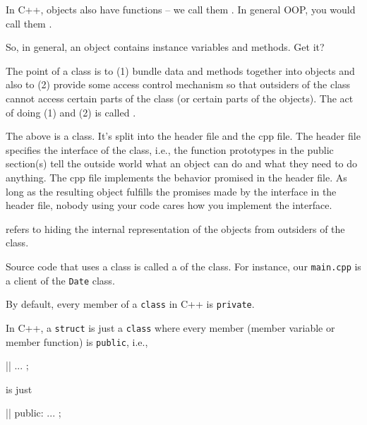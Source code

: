 In C++, objects also have functions -- we call them . In general OOP, you would call them .

So, in general, an object contains instance variables and methods. Get it?

The point of a class is to (1) bundle data and methods together into
objects and also to (2) provide some access control mechanism so that
outsiders of the class cannot access certain parts of the class (or
certain parts of the objects). The act of doing (1) and (2) is called
.

The above is a class. It's split into the header file and the cpp file. The
header file specifies the interface of the class, i.e., the function
prototypes in the public section(s) tell the outside world what an object
can do and what they need to do anything. The cpp file implements the
behavior promised in the header file. As long as the resulting object
fulfills the promises made by the interface in the header file, nobody
using your code cares how you implement the interface.

 refers to hiding the internal representation
of the objects from outsiders of the class.

Source code that uses a class is called a  of the
class. For instance, our \texttt{main.cpp} is a client of the
\texttt{Date} class.

By default, every member of a \texttt{class} in C++ is \texttt{private}.

In C++, a \texttt{struct} is just a \texttt{class} where every member
(member variable or member function) is \texttt{public}, i.e.,

\begin{consolethree}[escapeinside=||]
||
{
    ...
};
\end{consolethree}

is just

\begin{consolethree}[escapeinside=||]
||
{
public:
    ...
};
\end{consolethree}


